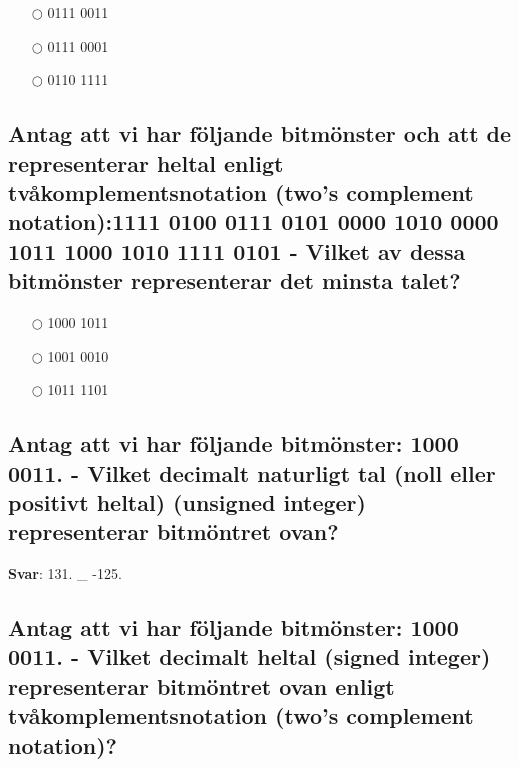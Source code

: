 \documentclass[a4paper,11pt,oneside]{article}
\begin{document}
\begin{sloppypar}
\label{q:35100:mc:sv:True}

\begin{itemize}
  \item[$\bigcirc$] 0111 0011
  \item[$\bigcirc$] 0111 0001
  \item[$\bigcirc$] 0110 1111
\end{itemize}

\subsection{Antag att vi har f\"oljande bitm\"onster och att de representerar heltal enligt tv\r{a}komplementsnotation (two{\textquoteright}s complement notation):1111 0100 0111 0101 0000 1010 0000 1011 1000 1010 1111 0101 - Vilket av dessa bitm\"onster representerar det minsta talet?}

\label{q:3510001:mc:sv:True}

\begin{itemize}
  \item[$\bigcirc$] 1000 1011
  \item[$\bigcirc$] 1001 0010
  \item[$\bigcirc$] 1011 1101
\end{itemize}



\subsection{Antag att vi har f\"oljande bitm\"onster: 1000 0011. - Vilket decimalt naturligt tal (noll eller positivt heltal) (unsigned integer) representerar bitm\"ontret ovan?}

\label{q:35200:sa:sv:True}

\textbf{Svar}: 131. _ -125.

\subsection{Antag att vi har f\"oljande bitm\"onster: 1000 0011. - Vilket decimalt heltal (signed integer) representerar bitm\"ontret ovan enligt tv\r{a}komplementsnotation (two{\textquoteright}s complement notation)?}

\label{q:3520001:sa:sv:True}

\vspace{2cm}

\noindent\makebox[\textwidth]{\hrulefill}

\vspace{1cm}


\end{sloppypar}
\end{document}
